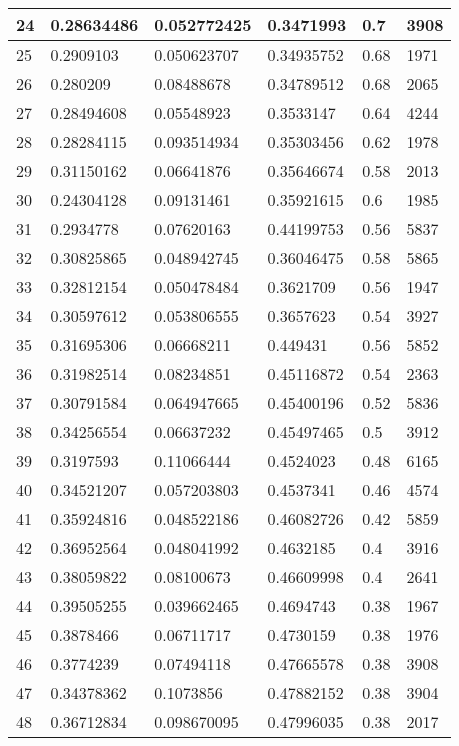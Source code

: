\begin{longtable}{|l|l|l|l|l|l|}
24 & 0.28634486 & 0.052772425 & 0.3471993 & 0.7 & 3908 \\ \hline 
25 & 0.2909103 & 0.050623707 & 0.34935752 & 0.68 & 1971 \\ \hline 
26 & 0.280209 & 0.08488678 & 0.34789512 & 0.68 & 2065 \\ \hline 
27 & 0.28494608 & 0.05548923 & 0.3533147 & 0.64 & 4244 \\ \hline 
28 & 0.28284115 & 0.093514934 & 0.35303456 & 0.62 & 1978 \\ \hline 
29 & 0.31150162 & 0.06641876 & 0.35646674 & 0.58 & 2013 \\ \hline 
30 & 0.24304128 & 0.09131461 & 0.35921615 & 0.6 & 1985 \\ \hline 
31 & 0.2934778 & 0.07620163 & 0.44199753 & 0.56 & 5837 \\ \hline 
32 & 0.30825865 & 0.048942745 & 0.36046475 & 0.58 & 5865 \\ \hline 
33 & 0.32812154 & 0.050478484 & 0.3621709 & 0.56 & 1947 \\ \hline 
34 & 0.30597612 & 0.053806555 & 0.3657623 & 0.54 & 3927 \\ \hline 
35 & 0.31695306 & 0.06668211 & 0.449431 & 0.56 & 5852 \\ \hline 
36 & 0.31982514 & 0.08234851 & 0.45116872 & 0.54 & 2363 \\ \hline 
37 & 0.30791584 & 0.064947665 & 0.45400196 & 0.52 & 5836 \\ \hline 
38 & 0.34256554 & 0.06637232 & 0.45497465 & 0.5 & 3912 \\ \hline 
39 & 0.3197593 & 0.11066444 & 0.4524023 & 0.48 & 6165 \\ \hline 
40 & 0.34521207 & 0.057203803 & 0.4537341 & 0.46 & 4574 \\ \hline 
41 & 0.35924816 & 0.048522186 & 0.46082726 & 0.42 & 5859 \\ \hline 
42 & 0.36952564 & 0.048041992 & 0.4632185 & 0.4 & 3916 \\ \hline 
43 & 0.38059822 & 0.08100673 & 0.46609998 & 0.4 & 2641 \\ \hline 
44 & 0.39505255 & 0.039662465 & 0.4694743 & 0.38 & 1967 \\ \hline 
45 & 0.3878466 & 0.06711717 & 0.4730159 & 0.38 & 1976 \\ \hline 
46 & 0.3774239 & 0.07494118 & 0.47665578 & 0.38 & 3908 \\ \hline 
47 & 0.34378362 & 0.1073856 & 0.47882152 & 0.38 & 3904 \\ \hline 
48 & 0.36712834 & 0.098670095 & 0.47996035 & 0.38 & 2017 \\ \hline 

\end{longtable}
